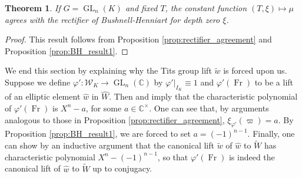 \documentclass{compositio}
\theoremstyle{plain}
\newtheorem{theorem}{Theorem}[section]
\theoremstyle{definition}
\DeclareMathOperator{\Fr}{Fr}
\DeclareMathOperator{\GL}{GL}
\newcommand{\CC}{\mathbb{C}}
\newcommand{\CCx}{\mathbb{C}^\times}
\newcommand{\Weil}{\mathcal{W}}
\begin{document}
\begin{theorem} \label{thm:bh_agreement}
  If $G = \GL_{n}(K)$ and fixed $T$, the constant function $(T,\xi) \mapsto \mu$ agrees with
  the rectifier of Bushnell-Henniart for depth zero $\xi$.
\end{theorem}

\begin{proof}
This result follows from Proposition \ref{prop:rectifier_agreement} and Proposition \ref{prop:BH_result1}.
\end{proof}

We end this section by explaining why the Tits group lift $\tilde{w}$ is forced upon us.
Suppose we define
$\varphi' : \Weil_K \rightarrow \GL_{n}(\CC)$ by $\varphi'|_{I_K} \equiv 1$ and
$\varphi'(\Fr)$ to be a lift of an elliptic element $\hat{w}$ in $\hat{W}$.
Then \cite[p. 824]{reeder-debacker:09a} and \cite[\S6]{reeder:08a} imply that the characteristic
polynomial of $\varphi'(\Fr)$ is $X^n - a$, for some $a \in \CCx$.  One can see that,
by arguments analogous to those in Proposition \ref{prop:rectifier_agreement},
$\xi_{\varphi'}(\varpi) = a$.  By Proposition \ref{prop:BH_result1}, we are
forced to set $a = (-1)^{n-1}$.  Finally, one can show by an inductive argument that the
canonical lift $\tilde{w}$ of $\hat{w}$ to $\widetilde{W}$ has characteristic polynomial $X^n - (-1)^{n-1}$,
so that $\varphi'(\Fr)$ is indeed the canonical lift of $\hat{w}$ to $\widetilde{W}$ up to conjugacy.



\end{document}
